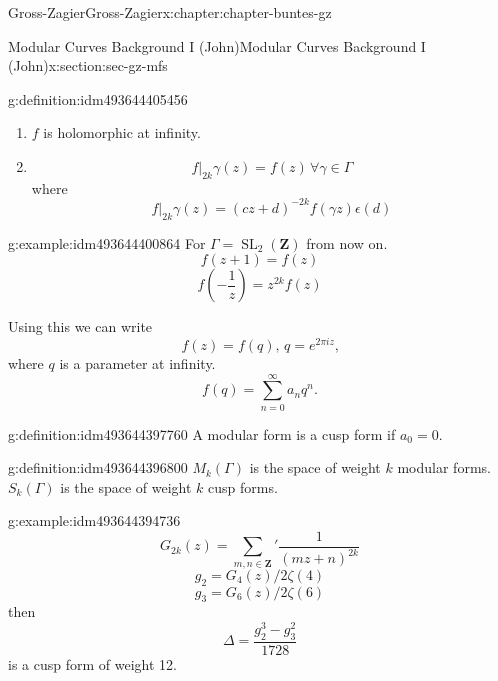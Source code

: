 \documentclass[oneside,10pt,]{book}
\numberwithin{equation}{section}
\newcommand{\ZZ}{\mathbf{Z}}
\DeclareMathOperator{\SL}{SL}
\begin{document}
\begin{chapterptx}{Gross-Zagier}{}{Gross-Zagier}{}{}{x:chapter:chapter-buntes-gz}
\begin{sectionptx}{Modular Curves Background I (John)}{}{Modular Curves Background I (John)}{}{}{x:section:sec-gz-mfs}
\begin{definition}{}{g:definition:idm493644405456}
\begin{enumerate}
\item{}\(f\) is holomorphic at infinity.%
\item{}%
\begin{equation*}
f|_{2k} \gamma (z) = f(z)\,\forall\gamma \in \Gamma 
\end{equation*}
where%
\begin{equation*}
f|_{2k} \gamma (z) = (cz+d)^{-2k}f(\gamma z)\epsilon (d)
\end{equation*}
%
\end{enumerate}
%
\end{definition}
\begin{example}{}{g:example:idm493644400864}%
For \(\Gamma =  \SL_2(\ZZ)\) from now on.%
\begin{equation*}
f(z+1) = f(z)
\end{equation*}
%
\begin{equation*}
f\left(-\frac 1z\right) = z^{2k}f(z)
\end{equation*}
%
\end{example}
Using this we can write%
\begin{equation*}
f(z) = f(q),\,q= e^{2\pi  i z}\text{,}
\end{equation*}
where \(q\) is a parameter at infinity.%
\begin{equation*}
f(q) = \sum_{n=0}^\infty a_n q^n\text{.}
\end{equation*}
%
\begin{definition}{}{g:definition:idm493644397760}%
A modular form is a cusp form if \(a_0 = 0\).%
\end{definition}
\begin{definition}{}{g:definition:idm493644396800}%
\(M_k(\Gamma )\) is the space of weight \(k\) modular forms. \(S_k(\Gamma )\) is the space of weight \(k\) cusp forms.%
\end{definition}
\begin{example}{}{g:example:idm493644394736}%
%
\begin{equation*}
G_{2k}(z) = \sum_{m,n\in \ZZ}' \frac{1}{(mz+n)^{2k}}
\end{equation*}
%
\begin{equation*}
g_{2} = G_4(z)/2\zeta (4)
\end{equation*}
%
\begin{equation*}
g_{3} = G_6(z)/2\zeta (6)
\end{equation*}
then%
\begin{equation*}
\Delta  = \frac{g_2^3 - g_3^2}{1728}
\end{equation*}
is a cusp form of weight 12.%

\end{example}
\end{sectionptx}
\end{chapterptx}
\end{document}
